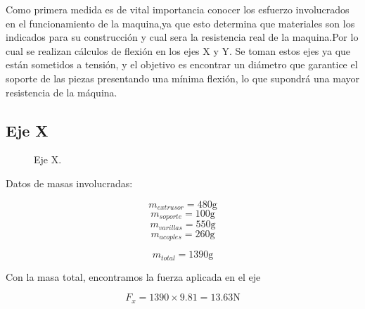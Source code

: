 Como primera medida es de vital importancia conocer los esfuerzo involucrados en el funcionamiento de la maquina,ya que esto determina que materiales son los indicados para su construcción y cual sera la resistencia real de la maquina.Por lo cual se realizan cálculos de flexión en los ejes X y Y. Se toman estos ejes ya que están sometidos a tensión, y el objetivo es encontrar un diámetro que garantice  el soporte de las piezas presentando una mínima flexión, lo que supondrá una mayor resistencia de la máquina.\\

\subsection{Eje X}

\begin{figure}[H]
    \centering
    \caption{Eje X.}
    \label{fig:preuba1}
\end{figure}

Datos de masas involucradas:

\[m_{extrusor}=480\text{g}\]
\[m_{soporte}=100\text{g}\]
\[m_{varillas}=550\text{g}\]
\[m_{acoples}=260\text{g}\]

\begin{equation}
m_{total}=1390\text{g}
\label{eq:101}
\end{equation}

Con la masa total, encontramos la fuerza aplicada en el eje

\begin{equation}
F_x=1390\times9.81=13.63\text{N}
\label{eq:102}
\end{equation}

